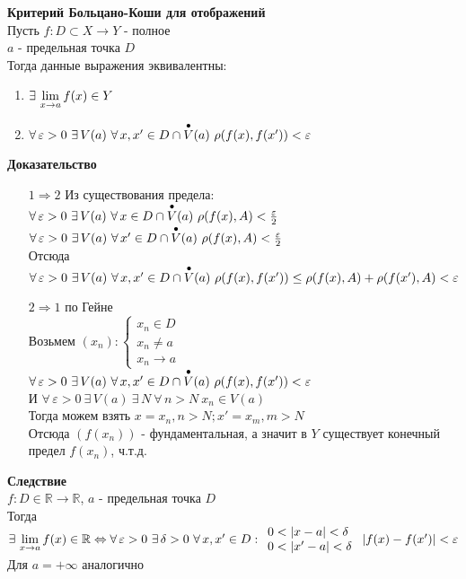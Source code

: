 \documentclass[12pt]{article}
\begin{document}
\textbf{Критерий Больцано-Коши для отображений}\\
Пусть $f:D\subset X \rightarrow Y$ - полное\\
$a$ - предельная точка $D$\\
Тогда данные выражения эквивалентны:
\begin{enumerate}
    \item $\exists\, \lim\limits_{x\rightarrow a}f(x) \in Y$
    \item $\forall\,\varepsilon>0\ \exists\,V(a)\ \forall\,x,x' \in D \cap \overdot{V}(a)\ \rho(f(x),f(x')) < \varepsilon$
\end{enumerate}
\textbf{Доказательство}
\begin{enumerate}
    \item[$1 \Rightarrow 2$] Из существования предела:\\
    $\forall\,\varepsilon>0\ \exists\,V(a)\ \forall\,x \in D \cap \overdot{V}(a)\ \rho(f(x),A) < \frac\varepsilon2$\\
    $\forall\,\varepsilon>0\ \exists\,V(a)\ \forall\,x' \in D \cap \overdot{V}(a)\ \rho(f(x),A) < \frac\varepsilon2$\\
    Отсюда $\forall\,\varepsilon>0\ \exists\,V(a)\ \forall\,x,x' \in D \cap \overdot{V}(a)\ \rho(f(x),f(x')) \leq \rho(f(x),A)+\rho(f(x'),A) < \varepsilon$
    \item[$2 \Rightarrow 1$] по Гейне\\
    Возьмем $(x_n): \left\{\begin{array}{l}
         x_n\in D\\
         x_n \neq a\\
         x_n \rightarrow a
    \end{array}\right.$\\
    $\forall\,\varepsilon>0\ \exists\,V(a)\ \forall\,x,x' \in D \cap \overdot{V}(a)\ \rho(f(x),f(x')) < \varepsilon$\\
    И $\forall\,\varepsilon>0\ \exists\,V(a)\ \exists\,N\ \forall\,n>N\ x_n\in V(a)$\\
    Тогда можем взять $x=x_n, n > N; x' = x_m, m > N$\\
    Отсюда $(f(x_n))$ - фундаментальная, а значит в $Y$ существует конечный предел $f(x_n)$, ч.т.д.
\end{enumerate}
\textbf{Следствие}\\
$f:D\in\mathbb{R}\rightarrow \mathbb{R}$, $a$ - предельная точка $D$\\
Тогда $\exists\,\liml_{x\rightarrow a}f(x) \in \mathbb{R} \Leftrightarrow \forall\,\varepsilon>0\ \exists\,\delta>0\ \forall\,x,x'\in D: \begin{array}{l}
     0 < |x-a|<\delta\\
     0 < |x'-a| < \delta
\end{array}\ |f(x)-f(x')| < \varepsilon$\\
Для $a=+\infty$ аналогично
\end{document}
